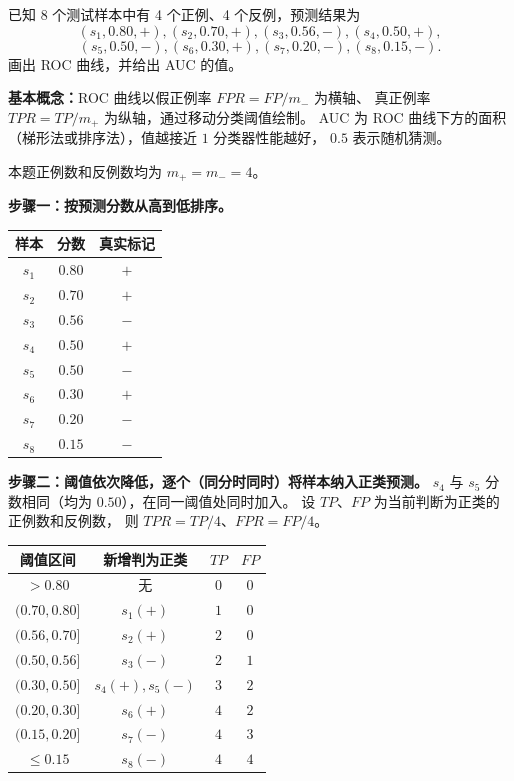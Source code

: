 \documentclass[a4, 10pt, comentarios]{aleph-notas}
\begin{document}
\begin{ejer}
已知 8 个测试样本中有 4 个正例、4 个反例，预测结果为
\[
(s_1,0.80,+),(s_2,0.70,+),(s_3,0.56,-),(s_4,0.50,+),
\]
\[
(s_5,0.50,-),(s_6,0.30,+),(s_7,0.20,-),(s_8,0.15,-).
\]
画出 ROC 曲线，并给出 AUC 的值。
\end{ejer}

\textbf{基本概念：}ROC 曲线以假正例率 $FPR=FP/m_-$ 为横轴、
真正例率 $TPR=TP/m_+$ 为纵轴，通过移动分类阈值绘制。
AUC 为 ROC 曲线下方的面积（梯形法或排序法），值越接近 $1$ 分类器性能越好，
$0.5$ 表示随机猜测。

本题正例数和反例数均为 $m_+=m_-=4$。

\textbf{步骤一：按预测分数从高到低排序。}
\begin{center}
\begin{tabular}{ccc}
\toprule
样本 & 分数 & 真实标记\\
\midrule
$s_1$ & $0.80$ & $+$\\
$s_2$ & $0.70$ & $+$\\
$s_3$ & $0.56$ & $-$\\
$s_4$ & $0.50$ & $+$\\
$s_5$ & $0.50$ & $-$\\
$s_6$ & $0.30$ & $+$\\
$s_7$ & $0.20$ & $-$\\
$s_8$ & $0.15$ & $-$\\
\end{tabular}
\end{center}

\textbf{步骤二：阈值依次降低，逐个（同分时同时）将样本纳入正类预测。}
$s_4$ 与 $s_5$ 分数相同（均为 $0.50$），在同一阈值处同时加入。
设 $TP$、$FP$ 为当前判断为正类的正例数和反例数，
则 $TPR=TP/4$、$FPR=FP/4$。

\begin{center}
\begin{tabular}{cccc}
\toprule
阈值区间 & 新增判为正类 & $TP$ & $FP$\\
\midrule
$>0.80$ & 无 & $0$ & $0$\\
$(0.70,0.80]$ & $s_1(+)$ & $1$ & $0$\\
$(0.56,0.70]$ & $s_2(+)$ & $2$ & $0$\\
$(0.50,0.56]$ & $s_3(-)$ & $2$ & $1$\\
$(0.30,0.50]$ & $s_4(+),s_5(-)$ & $3$ & $2$\\
$(0.20,0.30]$ & $s_6(+)$ & $4$ & $2$\\
$(0.15,0.20]$ & $s_7(-)$ & $4$ & $3$\\
$\leq0.15$ & $s_8(-)$ & $4$ & $4$\\
\bottomrule
\end{tabular}
\end{center}
\end{document}
